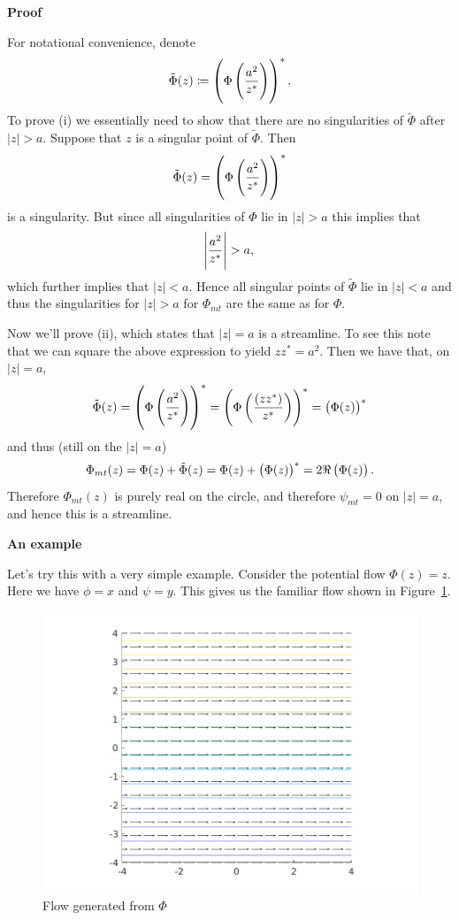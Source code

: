 \documentclass{article}
\def\ti#1{\tilde{#1}}
\begin{document}
\textbf{Proof}

For notational convenience, denote
%
\begin{equation*}
    \ti{\Phi}(z) \coloneqq \del{\Phi \del{\frac{a^2}{z^*}}}^*
    .
\end{equation*}
%
To prove (i) we essentially need to show that there are no singularities
of $\ti\Phi$ after $|z| > a$. Suppose that $z$ is a singular point of
$\ti\Phi$. Then
%
\begin{equation*}
    \ti\Phi(z) = \del{\Phi \del{\frac{a^2}{z^*}}}^*
\end{equation*}
%
is a singularity. But since all singularities of $\Phi$ lie in $|z| >
a$ this implies that
%
\begin{equation*}
    \envert{\frac{a^2}{z^*}} > a
    ,
\end{equation*}
%
which further implies that $|z| < a$. Hence all singular points of
$\ti\Phi$ lie in $|z| < a$ and thus the singularities for $|z| > a$ for
$\Phi_{mt}$ are the same as for $\Phi$.

Now we'll prove (ii), which states that $|z| = a$ is a streamline. To
see this note that we can square the above expression to yield $z z^* =
a^2$. Then we have that, on $|z| = a$,
%
\begin{equation*}
    \ti\Phi(z)
        = \del{\Phi \del{\frac{a^2}{z^*}}}^*
        = \del{\Phi \del{\frac{(z z^*)}{z^*}}}^*
        = \del{\Phi(z)}^*
\end{equation*}
%
and thus (still on the $|z| = a$)
%
\begin{equation*}
    \Phi_{mt}(z) = \Phi(z) + \ti\Phi(z) = \Phi(z) + \del{\Phi(z)}^* = 2 \Re\del{\Phi(z)}
    .
\end{equation*}
%
Therefore $\Phi_{mt}(z)$ is purely real on the circle, and therefore
$\psi_{mt} = 0$ on $|z| = a$, and hence this is a streamline.

\textbf{An example}

Let's try this with a very simple example. Consider the potential
flow $\Phi(z) = z$. Here we have $\phi = x$ and $\psi = y$. This gives
us the familiar flow shown in Figure~\ref{fig:mt-1}.
%
\begin{figure}[ht]
    \includegraphics[width=35em]{mt_ex1_1}
    \centering
    \caption{Flow generated from $\Phi$}
    \label{fig:mt-1}
\end{figure}
\end{document}
